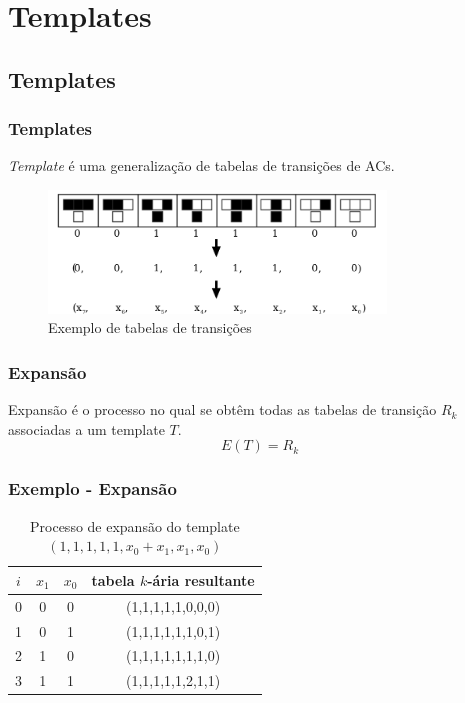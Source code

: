 \documentclass[aspectratio=43,hyperref={pdfpagelabels=false}]{beamer}
\begin{document}
\section{Templates}
\subsection*{Templates}
\begin{frame}
	\frametitle{Templates}
	
	\textit{Template} é uma generalização de tabelas de transições de ACs.
    \begin{figure}[h!]
        \centering
        \includegraphics[width=0.8\textwidth]{fig_transitionTable.pdf}
        \caption{Exemplo de tabelas de transições}
    \end{figure}
\end{frame}

\begin{frame}
	\frametitle{Expansão}
	Expansão é o processo no qual se obtêm todas as tabelas de transição $R_k$ associadas a um template $T$.
  \begin{equation}
  E(T)=R_k
  \end{equation}
 \end{frame}

\begin{frame}
    \frametitle{Exemplo -  Expansão}
    
  \begin{table}[h!]
  \centering
  \caption{Processo de expansão do template $(1,1,1,1,1,x_0+x_1,x_1,x_0)$}
    \begin{tabular}{cccc}
      \toprule
    $i$ & $x_1$ & $x_0$ & tabela $k$-ária resultante \\
      \midrule
    0 & 0 & 0 & (1,1,1,1,1,0,0,0) \\
    1 & 0 & 1 & (1,1,1,1,1,1,0,1) \\
    2 & 1 & 0 & (1,1,1,1,1,1,1,0) \\
    3 & 1 & 1 & (1,1,1,1,1,2,1,1) \\
      \bottomrule
      \end{tabular}
  \label{tab:invalideExpansion}
  \end{table}
\end{frame}
\end{document}
